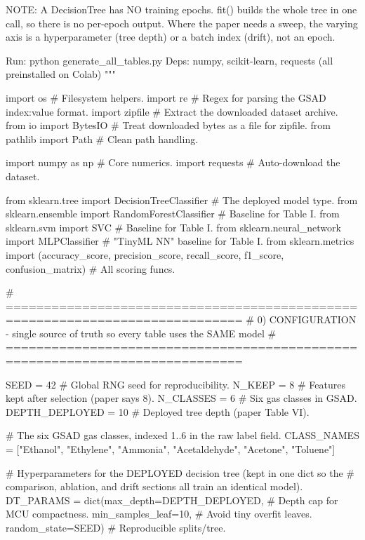 NOTE: A DecisionTree has NO training epochs. fit() builds the whole tree in
one call, so there is no per-epoch output. Where the paper needs a sweep,
the varying axis is a hyperparameter (tree depth) or a batch index (drift),
not an epoch.

Run:  python generate_all_tables.py
Deps: numpy, scikit-learn, requests   (all preinstalled on Colab)
"""

import os                                         # Filesystem helpers.
import re                                         # Regex for parsing the GSAD index:value format.
import zipfile                                    # Extract the downloaded dataset archive.
from io import BytesIO                            # Treat downloaded bytes as a file for zipfile.
from pathlib import Path                          # Clean path handling.

import numpy as np                                # Core numerics.
import requests                                   # Auto-download the dataset.

from sklearn.tree import DecisionTreeClassifier   # The deployed model type.
from sklearn.ensemble import RandomForestClassifier   # Baseline for Table I.
from sklearn.svm import SVC                        # Baseline for Table I.
from sklearn.neural_network import MLPClassifier   # "TinyML NN" baseline for Table I.
from sklearn.metrics import (accuracy_score, precision_score, recall_score,
                             f1_score, confusion_matrix)   # All scoring funcs.

# =============================================================================
# 0) CONFIGURATION - single source of truth so every table uses the SAME model
# =============================================================================

SEED = 42                                          # Global RNG seed for reproducibility.
N_KEEP = 8                                          # Features kept after selection (paper says 8).
N_CLASSES = 6                                       # Six gas classes in GSAD.
DEPTH_DEPLOYED = 10                                 # Deployed tree depth (paper Table VI).

# The six GSAD gas classes, indexed 1..6 in the raw label field.
CLASS_NAMES = ["Ethanol", "Ethylene", "Ammonia",
               "Acetaldehyde", "Acetone", "Toluene"]

# Hyperparameters for the DEPLOYED decision tree (kept in one dict so the
# comparison, ablation, and drift sections all train an identical model).
DT_PARAMS = dict(max_depth=DEPTH_DEPLOYED,          # Depth cap for MCU compactness.
                 min_samples_leaf=10,               # Avoid tiny overfit leaves.
                 random_state=SEED)                 # Reproducible splits/tree.

